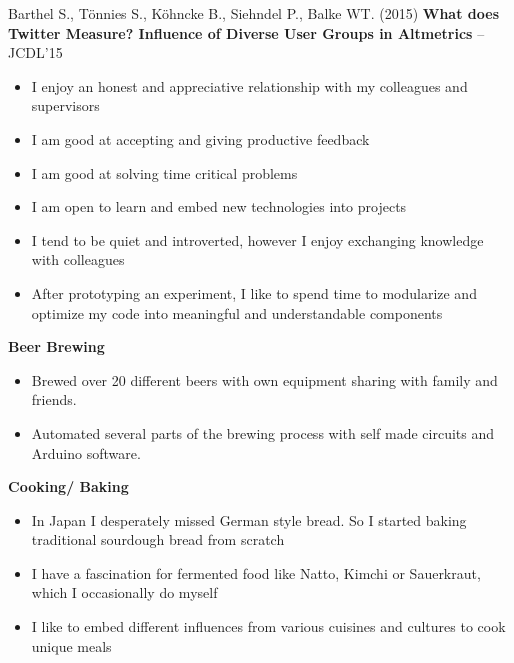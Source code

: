 \documentclass[
	a4paper,
]{fortysecondscv}
\begin{document}
\hspace{5em}

Barthel S., Tönnies S., Köhncke B., Siehndel P., Balke WT. (2015) \textbf{What does Twitter Measure? Influence of Diverse User Groups in Altmetrics} -- JCDL'15\par
    
\begin{itemize}[topsep=3pt,itemsep=1pt,leftmargin=*,parsep=1pt]%
    \item I enjoy an honest and appreciative relationship with my colleagues and supervisors%
    \item I am good at accepting and giving productive feedback%
    \item I am good at solving time critical problems%
    \item I am open to learn and embed new technologies into projects%
    \item I tend to be quiet and introverted, however I enjoy exchanging knowledge with colleagues%
    \item After prototyping an experiment, I like to spend time to modularize and optimize my code into meaningful and understandable components%
\end{itemize}


\textbf{Beer Brewing}
\begin{itemize}[topsep=3pt,itemsep=1pt,leftmargin=*,parsep=1pt]%
    \item Brewed over 20 different beers with own equipment sharing with family and friends.%
    \item Automated several parts of the brewing process with self made circuits and Arduino software.%
\end{itemize}    

\textbf{Cooking/ Baking}
\begin{itemize}[topsep=3pt,itemsep=1pt,leftmargin=*,parsep=1pt]%
    \item In Japan I desperately missed German style bread. So I started baking traditional sourdough bread from scratch%
    \item I have a fascination for fermented food like Natto, Kimchi or Sauerkraut, which I occasionally do myself%
    \item I like to embed different influences from various cuisines and cultures to cook unique meals%
\end{itemize}
\end{document}

